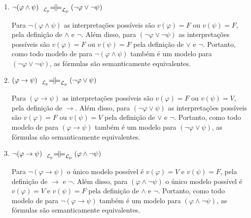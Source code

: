 \begin{enumerate}[label=\arabic*., left=0.5cm, align=left, nosep]
\begin{enumerate}[label=(\alph*), left=0.5cm, align=left, nosep]
                    Para $(\varphi \land \psi)$ $\land \chi$ o único modelo possível é $v(\varphi) = V$, $v(\psi) = V$ e $v(\chi) 
                    = V$, pela definição de $\land$. De forma análoga, para $\varphi \land (\psi \land \chi)$ o único modelo possível
                    é $v(\varphi) = V$, $v(\psi) = V$ e $v(\chi) = V$. Portanto, como todo modelo de para $(\varphi \land \psi) \land
                    \chi$ também é um modelo para $\varphi \land (\psi \land \chi)$, as fórmulas são semanticamente equivalentes.

                    \item $\neg(\varphi \land \psi) \Lpbimodels (\neg \varphi \lor \neg \psi)$
    
                    Para $\neg(\varphi \land \psi)$ as interpretações possíveis são $v(\varphi) = F$ ou $v(\psi) = F$, pela definição
                    de $\land$ e $\neg$. Além disso, para $(\neg \varphi \lor \neg \psi)$ as interpretações possíveis são $v(\varphi) 
                    = F$ ou $v(\psi) = F$ pela definição de $\lor$ e $\neg$. Portanto, como todo modelo de para $\neg(\varphi \land
                    \psi)$ também é um modelo para $(\neg \varphi \lor \neg \psi)$, as fórmulas são semanticamente equivalentes.

                    \item $(\varphi \to \psi) \Lpbimodels (\neg \varphi \lor \psi)$
                    
                    Para $(\varphi \to \psi)$ as interpretações possíveis são $v(\varphi) = F$ ou $v(\psi) = V$, pela definição
                    de $\to$. Além disso, para $(\neg \varphi \lor \psi)$ as interpretações possíveis são $v(\varphi) = F$ ou $v(\psi) 
                    = V$ pela definição de $\lor$ e $\neg$. Portanto, como todo modelo de para $(\varphi \to \psi)$ também é um modelo
                    para $(\neg \varphi \lor \psi)$, as fórmulas são semanticamente equivalentes.

                    \item $\neg(\varphi \to \psi) \Lpbimodels (\varphi \land \neg \psi)$
            
                    Para $\neg(\varphi \to \psi)$ o único modelo possível é $v(\varphi) = V$ e $v(\psi) = F$, pela definição
                    de $\to$ e $\neg$. Além disso, para $(\varphi \land \neg \psi)$ o único modelo possível é $v(\varphi) = V$ e
                    $v(\psi) = F$ pela definição de $\land$ e $\neg$. Portanto, como todo modelo de para $\neg(\varphi \to \psi)$ 
                    também é um modelo para $(\varphi \land \neg \psi)$, as fórmulas são semanticamente equivalentes.


\end{enumerate}
\end{enumerate}
